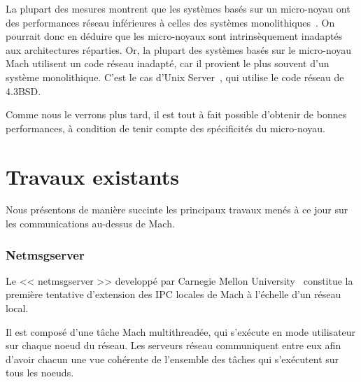 La plupart des mesures montrent que les syst\`emes
bas\'es sur un micro-noyau ont des performances r\'eseau inf\'erieures
\`a celles des syst\`emes monolithiques~\cite{Maeda92}. On
pourrait donc en d\'eduire que les micro-noyaux sont intrins\`equement
inadapt\'es aux architectures r\'eparties. 
Or, la plupart des syst\`emes bas\'es sur le micro-noyau Mach
utilisent un code r\'eseau inadapt\'e, car il provient le plus souvent d'un syst\`eme monolithique. C'est le cas d'Unix Server~\cite{Golub90}, qui utilise le code r\'eseau de 4.3BSD.

Comme nous le verrons plus tard, il est tout \`a fait possible d'obtenir de bonnes performances, \`a condition de tenir compte des sp\'ecificit\'es du micro-noyau.

\section {Travaux existants}

Nous pr\'esentons de mani\`ere succinte les principaux travaux men\'es \`a ce 
jour sur les communications au-dessus de Mach. 

\subsubsection{Netmsgserver}

Le << netmsgserver >> developp\'e par Carnegie Mellon University~\cite{Sansom86} constitue la premi\`ere tentative d'extension des IPC locales de Mach \`a l'\'echelle
d'un r\'eseau local.

Il est compos\'e d'une t\^ache Mach multithread\'ee, qui s'ex\'ecute en mode
utilisateur sur chaque noeud du r\'eseau. Les serveurs r\'eseau communiquent
entre eux afin d'avoir chacun une vue coh\'erente de l'ensemble des t\^aches
qui s'ex\'ecutent sur tous les noeuds.

